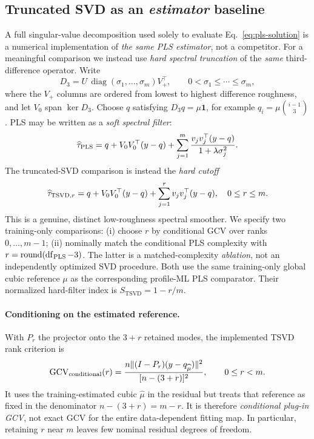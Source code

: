 \subsection{Truncated SVD as an \emph{estimator} baseline}
A full singular-value decomposition used solely to evaluate
Eq.~\eqref{eq:pls-solution} is a numerical implementation
of \emph{the same PLS estimator}, not a competitor. For a
meaningful comparison we instead use \emph{hard spectral
truncation} of the \emph{same} third-difference operator.
Write
\begin{equation}
D_3=U\,\operatorname{diag}(\sigma_1,\ldots,\sigma_m)V_+^\top,
\qquad 0<\sigma_1\le\cdots\le\sigma_m,
\end{equation}
where the $V_+$ columns are ordered from lowest to
highest difference roughness, and let $V_0$ span
$\ker D_3$. Choose $q$ satisfying
$D_3q=\mu\mathbf1$, for example
$q_i=\mu\binom{i-1}{3}$. PLS may be written as a
\emph{soft spectral filter}:
\begin{equation}\label{eq:pls-filter}
\widehat\tau_{\rm PLS}
=q+V_0V_0^\top(y-q)
+\sum_{j=1}^{m}
\frac{v_jv_j^\top(y-q)}{1+\lambda\sigma_j^2}.
\end{equation}
The truncated-SVD comparison is instead the
\emph{hard cutoff}
\begin{equation}\label{eq:tsvd-filter}
\widehat\tau_{{\rm TSVD},r}
=q+V_0V_0^\top(y-q)+
\sum_{j=1}^{r}v_jv_j^\top(y-q),
\quad 0\le r\le m.
\end{equation}
This is a genuine, distinct low-roughness spectral
smoother. We specify two training-only comparisons:
(i) choose $r$ by conditional GCV over ranks
$0,\ldots,m-1$; (ii) nominally match the conditional
PLS complexity with
$r=\operatorname{round}(\operatorname{df}_{\rm PLS}-3)$.
The latter is a matched-complexity \emph{ablation}, not
an independently optimized SVD procedure. Both use the
same training-only global cubic reference $\mu$ as
the corresponding profile-ML PLS comparator.
Their normalized hard-filter index is
$S_{\mathrm{TSVD}}=1-r/m$.

\paragraph{Conditioning on the estimated reference.}
With $P_r$ the projector onto the $3+r$ retained
modes, the implemented TSVD rank criterion is
\begin{equation}\label{eq:tsvd-conditional-gcv}
\mathrm{GCV}_{\rm conditional}(r)
=\frac{n\| (I-P_r)(y-q_{\widehat\mu})\|^2}
{[n-(3+r)]^2},\qquad 0\le r<m.
\end{equation}
It uses the training-estimated cubic $\widehat\mu$ in
the residual but treats that reference as fixed
in the denominator $n-(3+r)=m-r$. It is therefore
\emph{conditional plug-in GCV}, not exact GCV
for the entire data-dependent fitting map.
In particular, retaining $r$ near $m$ leaves
few nominal residual degrees of freedom.

